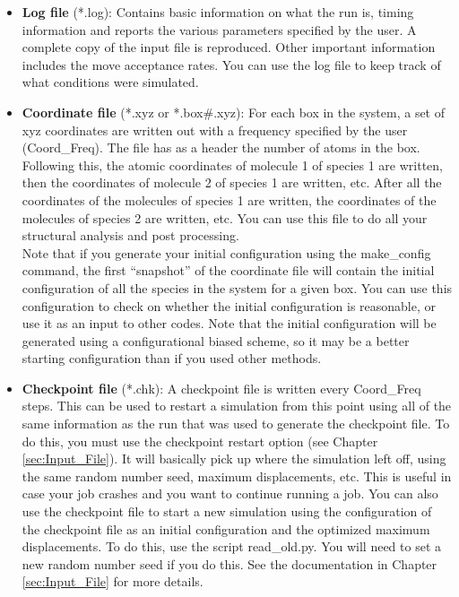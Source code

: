 \begin{itemize}

\item {\bf Log file} (*.log): Contains basic information on what the run is, timing information and reports the various parameters specified by the user. A complete copy of the input file is reproduced. Other important information includes the move acceptance rates. You can use the log file to keep track of what conditions were simulated.

\item {\bf Coordinate file} (*.xyz or *.box\#.xyz): For each box in the system, a set of xyz coordinates are written out with a frequency specified by the user (Coord\_Freq). The file has as a header the number of atoms in the box. Following this, the atomic coordinates of molecule 1 of species 1 are written, then the coordinates of molecule 2 of species 1 are written, etc. After all the coordinates of the molecules of species 1 are written, the coordinates of the molecules of species 2 are written, etc. You can use this file to do all your structural analysis and post processing.\\

Note that if you generate your initial configuration using the make\_config command, the first ``snapshot'' of the coordinate file
will contain the initial configuration of all the species in the system for a given box. You can use this configuration to check on whether the initial configuration 
is reasonable, or use it as an input to other codes. Note that the initial configuration will be generated using a configurational biased scheme,  
so it may be a better starting configuration than if you used other methods. 

\item {\bf Checkpoint file} (*.chk): A checkpoint file is written every Coord\_Freq steps. This can be used to restart a simulation from this point using all of the same information as the run that was used to generate the checkpoint file. To do this, you must use the checkpoint restart option (see Chapter \ref{sec:Input_File}). It will basically pick up where the simulation left off, using the same random number seed, maximum displacements, etc. This is useful in case your job crashes and you want to continue running a job. You can also use the checkpoint file to start a new simulation using the  configuration of the checkpoint file as an initial configuration and the optimized maximum displacements.  To do this, use the script read\_old.py. You will need to set a new random number seed if you do this. See the documentation in Chapter \ref{sec:Input_File} for more details.


\end{itemize}
